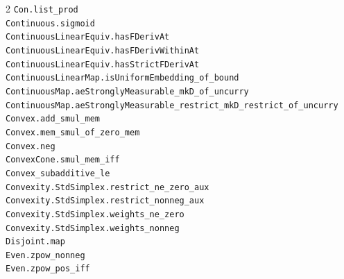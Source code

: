 \documentclass[10pt,a4paper]{article}
\begin{document}
\begin{multicols}{2}
\texttt{Con.\allowbreak{}list\_prod} \\
\texttt{Continuous.\allowbreak{}sigmoid} \\
\texttt{ContinuousLinearEquiv.\allowbreak{}hasFDerivAt} \\
\texttt{ContinuousLinearEquiv.\allowbreak{}hasFDerivWithinAt} \\
\texttt{ContinuousLinearEquiv.\allowbreak{}hasStrictFDerivAt} \\
\texttt{ContinuousLinearMap.\allowbreak{}isUniformEmbedding\_of\_bound} \\
\texttt{ContinuousMap.\allowbreak{}aeStronglyMeasurable\_mkD\_of\_uncurry} \\
\texttt{ContinuousMap.\allowbreak{}aeStronglyMeasurable\_restrict\_mkD\_restrict\_of\_uncurry} \\
\texttt{Convex.\allowbreak{}add\_smul\_mem} \\
\texttt{Convex.\allowbreak{}mem\_smul\_of\_zero\_mem} \\
\texttt{Convex.\allowbreak{}neg} \\
\texttt{ConvexCone.\allowbreak{}smul\_mem\_iff} \\
\texttt{Convex\_subadditive\_le} \\
\texttt{Convexity.\allowbreak{}StdSimplex.\allowbreak{}restrict\_ne\_zero\_aux} \\
\texttt{Convexity.\allowbreak{}StdSimplex.\allowbreak{}restrict\_nonneg\_aux} \\
\texttt{Convexity.\allowbreak{}StdSimplex.\allowbreak{}weights\_ne\_zero} \\
\texttt{Convexity.\allowbreak{}StdSimplex.\allowbreak{}weights\_nonneg} \\
\texttt{Disjoint.\allowbreak{}map} \\
\texttt{Even.\allowbreak{}zpow\_nonneg} \\
\texttt{Even.\allowbreak{}zpow\_pos\_iff} \\

\end{multicols}
\end{document}
